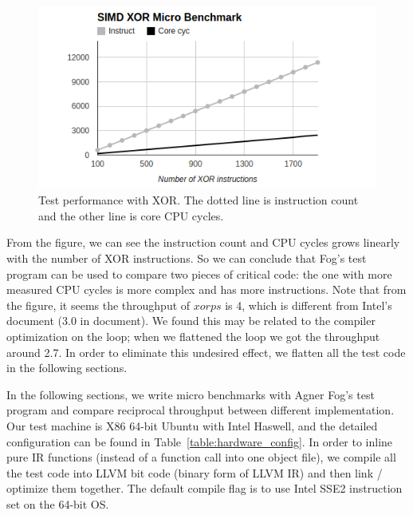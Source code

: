 \begin{figure}[ht!]
\centering
\includegraphics[width=140mm]{draw/testp_xor.png}
\caption[Test Performance with XOR]{Test performance with XOR\@. The dotted line is instruction count and the other line is core CPU cycles.}
\label{figure:testp_xor}
\end{figure}

From the figure, we can see the instruction count and CPU cycles grows linearly with the number of XOR instructions. So we can conclude that Fog's test program can be used to compare two pieces of critical code: the one with more measured CPU cycles is more complex and has more instructions. Note that from the figure, it seems the throughput of $xorps$ is 4, which is different from Intel's document (3.0 in document). We found this may be related to the compiler optimization on the loop; when we flattened the loop we got the throughput around 2.7. In order to eliminate this undesired effect, we flatten all the test code in the following sections.

In the following sections, we write micro benchmarks with Agner Fog's test program and compare reciprocal throughput between different implementation. Our test machine is X86 64-bit Ubuntu with Intel Haswell, and the detailed configuration can be found in Table~\ref{table:hardware_config}. In order to inline pure IR functions (instead of a function call into one object file), we compile all the test code into LLVM bit code (binary form of LLVM IR) and then link / optimize them together. The default compile flag is to use Intel SSE2 instruction set on the 64-bit OS.

